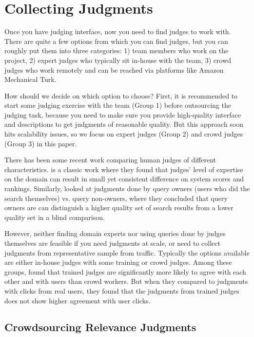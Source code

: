 \section{Collecting Judgments}

Once you have judging interface, now you need to find judges to work with. There are quite a few options from which you can find judges, but you can roughly put them into three categories: 1) team members who work on the project, 2) expert judges who typically sit in-house with the team, 3) crowd judges who work remotely and can be reached via platforms like Amazon Mechanical Turk. 

How should we decide on which option to choose? First, it is recommended to start some judging exercise with the team (Group 1) before outsourcing the judging task, because you need to make sure you provide high-quality interface and descriptions to get judgments of reasonable quality. But this approach soon hits scalability issues, so we focus on expert judges (Group 2) and crowd judges (Group 3) in this paper.

There has been some recent work comparing human judges of different characteristics. \cite{Bailey:2008} is a classic work where they found that judges' level of expertise on the domain can result in small yet consistent difference on system scores and rankings. Similarly, \cite{Chouldechova:2013} looked at judgments done by query owners (users who did the search themselves) vs. query non-owners, where they concluded that query owners are can distinguish a higher quality set of search results from a lower quality set in a blind comparison.

However, neither finding domain experts nor using queries done by judges themselves are feasible if you need judgments at scale, or need to collect judgments from representative sample from traffic. Typically the options available are either in-house judges with some training or crowd judges. Among these groups,  \cite{Kazai:2013} found that trained judges are significantly more likely to agree with each other and with users than crowd workers. But when they compared to judgments with clicks from real users, they found that the judgments from trained judges does not show higher agreement with user clicks.

\subsection{Crowdsourcing Relevance Judgments}

